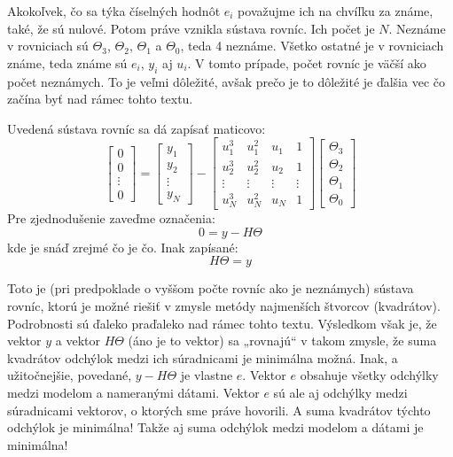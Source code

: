 \documentclass[a4paper, 10pt, ]{article}
\begin{document}
Akokoľvek, čo sa týka číselných hodnôt $e_i$ považujme ich na chvíľku za známe, také, že sú nulové. Potom práve vznikla sústava rovníc. Ich počet je $N$. Neznáme v rovniciach sú $\Theta_3$, $\Theta_2$, $\Theta_1$ a $\Theta_0$, teda 4 neznáme. Všetko ostatné je v rovniciach známe, teda známe sú $e_i$, $y_i$ aj $u_i$. V tomto prípade, počet rovníc je väčší ako počet neznámych. To je veľmi dôležité, avšak prečo je to dôležité je ďalšia vec čo začína byť nad rámec tohto textu.

Uvedená sústava rovníc sa dá zapísať maticovo:
\begin{equation} \label{detailPreurcVseob}
    \begin{bmatrix}
        0 \\ 0 \\\vdots \\ 0
    \end{bmatrix}
    =
    \begin{bmatrix}
        y_1 \\ y_2 \\\vdots \\ y_N
    \end{bmatrix}
    -
    \begin{bmatrix}
        u_1^3 & u_1^2 & u_1 & 1 \\
        u_2^3 & u_2^2 & u_2 & 1 \\
        \vdots & \vdots & \vdots & \vdots \\
        u_N^3 & u_N^2 & u_N & 1
    \end{bmatrix}
    \begin{bmatrix}
        \Theta_3 \\ \Theta_2 \\ \Theta_1 \\ \Theta_0
    \end{bmatrix}
\end{equation}
Pre zjednodušenie zaveďme označenia:
\begin{equation}
    0 = y - H \Theta
\end{equation}
kde je snáď zrejmé čo je čo. Inak zapísané:
\begin{equation} \label{psrtem}
    H \Theta = y
\end{equation}

Toto je (pri predpoklade o vyššom počte rovníc ako je neznámych) sústava rovníc, ktorú je možné riešiť v zmysle metódy najmenších štvorcov (kvadrátov). Podrobnosti sú ďaleko praďaleko nad rámec tohto textu. Výsledkom však je, že vektor $y$ a vektor $H \Theta$ (áno je to vektor) sa „rovnajú“ v takom zmysle, že suma kvadrátov odchýlok medzi ich súradnicami je minimálna možná. Inak, a užitočnejšie, povedané, $y - H \Theta$ je vlastne $e$. Vektor $e$ obsahuje všetky odchýlky medzi modelom a nameranými dátami. Vektor $e$ sú ale aj odchýlky medzi súradnicami vektorov, o ktorých sme práve hovorili. A suma kvadrátov týchto odchýlok je minimálna! Takže aj suma odchýlok medzi modelom a dátami je minimálna!
\end{document}

